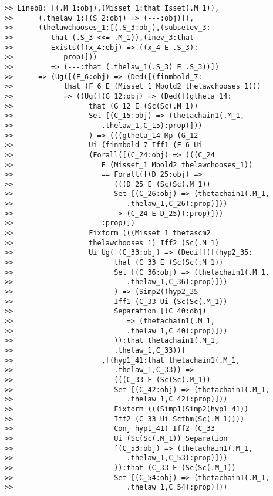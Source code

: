 \documentclass[12pt]{article}
\begin{document}
\begin{verbatim}
>> Lineb8: [(.M_1:obj),(Misset_1:that Isset(.M_1)),
>>      (.thelaw_1:[(S_2:obj) => (---:obj)]),
>>      (thelawchooses_1:[(.S_3:obj),(subsetev_3:
>>         that (.S_3 <<= .M_1)),(inev_3:that
>>         Exists([(x_4:obj) => ((x_4 E .S_3):
>>            prop)]))
>>         => (---:that (.thelaw_1(.S_3) E .S_3))])
>>      => (Ug([(F_6:obj) => (Ded([(finmbold_7:
>>            that (F_6 E (Misset_1 Mbold2 thelawchooses_1)))
>>            => ((Ug([(G_12:obj) => (Ded([(gtheta_14:
>>                  that (G_12 E (Sc(Sc(.M_1))
>>                  Set [(C_15:obj) => (thetachain1(.M_1,
>>                     .thelaw_1,C_15):prop)]))
>>                  ) => (((gtheta_14 Mp (G_12
>>                  Ui (finmbold_7 Iff1 (F_6 Ui
>>                  (Forall([(C_24:obj) => (((C_24
>>                     E (Misset_1 Mbold2 thelawchooses_1))
>>                     == Forall([(D_25:obj) =>
>>                        (((D_25 E (Sc(Sc(.M_1))
>>                        Set [(C_26:obj) => (thetachain1(.M_1,
>>                           .thelaw_1,C_26):prop)]))
>>                        -> (C_24 E D_25)):prop)]))
>>                     :prop)])
>>                  Fixform (((Misset_1 thetascm2
>>                  thelawchooses_1) Iff2 (Sc(.M_1)
>>                  Ui Ug([(C_33:obj) => (Dediff([(hyp2_35:
>>                        that (C_33 E (Sc(Sc(.M_1))
>>                        Set [(C_36:obj) => (thetachain1(.M_1,
>>                           .thelaw_1,C_36):prop)]))
>>                        ) => (Simp2((hyp2_35
>>                        Iff1 (C_33 Ui (Sc(Sc(.M_1))
>>                        Separation [(C_40:obj)
>>                           => (thetachain1(.M_1,
>>                           .thelaw_1,C_40):prop)]))
>>                        )):that thetachain1(.M_1,
>>                        .thelaw_1,C_33))]
>>                     ,[(hyp1_41:that thetachain1(.M_1,
>>                        .thelaw_1,C_33)) =>
>>                        (((C_33 E (Sc(Sc(.M_1))
>>                        Set [(C_42:obj) => (thetachain1(.M_1,
>>                           .thelaw_1,C_42):prop)]))
>>                        Fixform (((Simp1(Simp2(hyp1_41))
>>                        Iff2 (C_33 Ui Scthm(Sc(.M_1))))
>>                        Conj hyp1_41) Iff2 (C_33
>>                        Ui (Sc(Sc(.M_1)) Separation
>>                        [(C_53:obj) => (thetachain1(.M_1,
>>                           .thelaw_1,C_53):prop)]))
>>                        )):that (C_33 E (Sc(Sc(.M_1))
>>                        Set [(C_54:obj) => (thetachain1(.M_1,
>>                           .thelaw_1,C_54):prop)]))

\end{verbatim}
\end{document}
